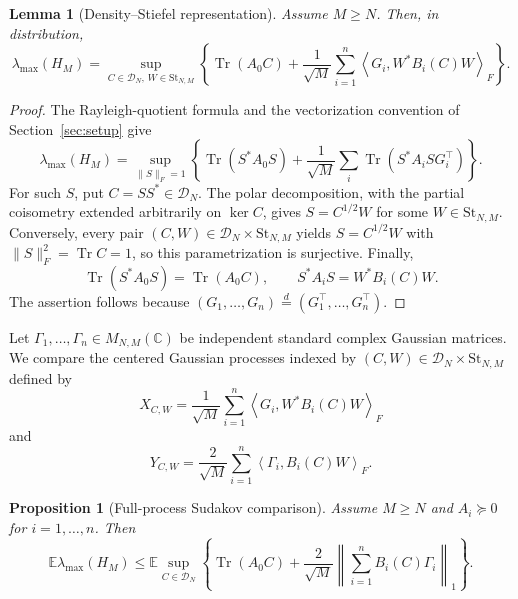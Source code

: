 \documentclass{article}
\newtheorem{proposition}[theorem]{Proposition}
\newtheorem{lemma}[theorem]{Lemma}
\newcommand{\C}{\mathbb C}
\newcommand{\E}{\mathbb E}
\newcommand{\DN}{\mathcal D_N}
\newcommand{\St}{\mathrm{St}}
\newcommand{\ip}[2]{\left\langle #1,#2\right\rangle}
\DeclareMathOperator{\Tr}{Tr}
\begin{document}
\begin{lemma}[Density--Stiefel representation]
	\label{lem:density-stiefel}
	Assume \(M\ge N\).  Then, in distribution,
	\begin{equation}
		\label{eq:lambdamax-density-stiefel}
		\lambda_{\max}(H_M)
		=
		\sup_{C\in\DN,\,W\in\St_{N,M}}
		\left\{
		\Tr(A_0C)+\frac1{\sqrt M}\sum_{i=1}^n
		\ip{G_i}{W^*B_i(C)W}_F
		\right\}.
	\end{equation}
\end{lemma}

\begin{proof}
	The Rayleigh-quotient formula and the vectorization convention of
	Section~\ref{sec:setup} give
	\[
		\lambda_{\max}(H_M)
		=
		\sup_{\|S\|_F=1}
		\left\{
		\Tr(S^*A_0S)+\frac1{\sqrt M}\sum_i
		\Tr(S^*A_iS G_i^{\top})
		\right\}.
	\]
	For such \(S\), put \(C=SS^*\in\DN\).  The polar decomposition, with
	the partial coisometry extended arbitrarily on \(\ker C\), gives
	\(S=C^{1/2}W\) for some \(W\in\St_{N,M}\).  Conversely, every pair
	\((C,W)\in\DN\times\St_{N,M}\) yields \(S=C^{1/2}W\) with
	\(\|S\|_F^2=\Tr C=1\), so this parametrization is surjective.  Finally,
	\[
		\Tr(S^*A_0S)=\Tr(A_0C),\qquad
		S^*A_iS=W^*B_i(C)W.
	\]
	The assertion follows because
	\((G_1,\ldots,G_n)\overset{d}{=}
	(G_1^{\top},\ldots,G_n^{\top})\).
\end{proof}

Let $\Gamma_1,\ldots,\Gamma_n\in M_{N,M}(\C)$ be independent standard complex
Gaussian matrices.  We compare the centered Gaussian processes indexed by
$(C,W)\in\DN\times\St_{N,M}$ defined by
\begin{equation}
	\label{eq:original-process}
	X_{C,W}=\frac1{\sqrt M}\sum_{i=1}^n
	\ip{G_i}{W^*B_i(C)W}_F
\end{equation}
and
\begin{equation}
	\label{eq:comparison-process}
	Y_{C,W}=\frac2{\sqrt M}\sum_{i=1}^n\ip{\Gamma_i}{B_i(C)W}_F.
\end{equation}

\begin{proposition}[Full-process Sudakov comparison]
	\label{prop:fullprocess}
	Assume $M\ge N$ and $A_i\succeq0$ for $i=1,\ldots,n$.
	Then
	\[
		\E\lambda_{\max}(H_M)
		\le
		\E\sup_{C\in\DN}
		\left\{
		\Tr(A_0C)+\frac2{\sqrt M}\left\|\sum_{i=1}^nB_i(C)\Gamma_i\right\|_1
		\right\}.
	\]
\end{proposition}
\end{document}

